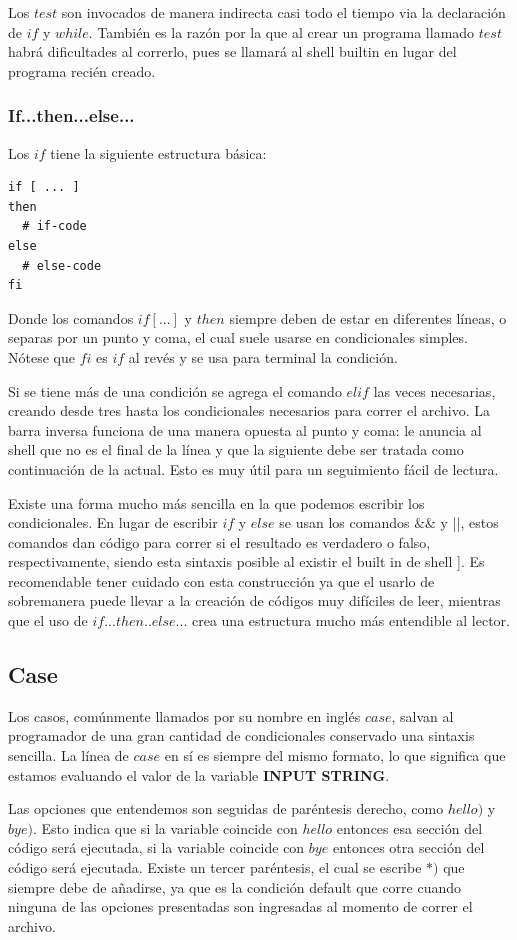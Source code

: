 \documentclass{article}
\begin{document}
Los $test$ son invocados de manera indirecta casi todo el tiempo via la declaración de $if$ y $while$. También es la razón por la que al crear un programa llamado $test$ habrá dificultades al correrlo, pues se llamará al shell builtin en lugar del programa recién creado.

\subsubsection{If...then...else...}
Los $if$ tiene la siguiente estructura básica:
\begin{verbatim}
if [ ... ]
then
  # if-code
else
  # else-code
fi
\end{verbatim}
Donde los comandos $if [...]$ y $then$ siempre deben de estar en diferentes líneas, o separas por un punto y coma, el cual suele usarse en condicionales simples. Nótese que $fi$ es $if$ al revés y se usa para terminal la condición.

Si se tiene más de una condición se agrega el comando $elif$ las veces necesarias, creando desde tres hasta los condicionales necesarios para correr el archivo. La barra inversa funciona de una manera opuesta al punto y coma: le anuncia al shell que no es el final de la línea y que la siguiente debe ser tratada como continuación de la actual. Esto es muy útil para un seguimiento fácil de lectura.

Existe una forma mucho más sencilla en la que podemos escribir los condicionales. En lugar de escribir $if$ y $else$ se usan los comandos $\&\&$ y ||, estos comandos dan código para correr si el resultado es verdadero o falso, respectivamente, siendo esta sintaxis posible al existir el built in de shell ]. Es recomendable tener cuidado con esta construcción ya que el usarlo de sobremanera puede llevar a la creación de códigos muy difíciles de leer, mientras que el uso de $if...then..else...$ crea una estructura mucho más entendible al lector. 

\subsection{Case}
Los casos, comúnmente llamados por su nombre en inglés $case$, salvan al programador de una gran cantidad de condicionales conservado una sintaxis sencilla. La línea de $case$ en sí es siempre del mismo formato, lo que significa que estamos evaluando el valor de la variable \textbf{INPUT STRING}.

Las opciones que entendemos son seguidas de paréntesis derecho, como $hello)$ y $bye)$. Esto indica que si la variable coincide con $hello$ entonces esa sección del código será ejecutada, si la variable coincide con $bye$ entonces otra sección del código será ejecutada. Existe un tercer paréntesis, el cual se escribe $*)$ que siempre debe de añadirse, ya que es la condición default que corre cuando ninguna de las opciones presentadas son ingresadas al momento de correr el archivo. 
\end{document}
